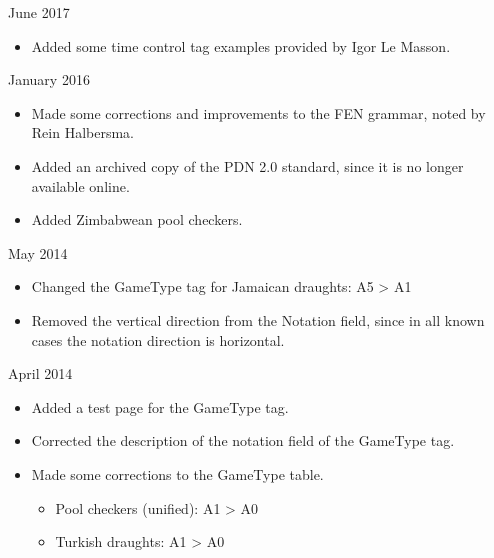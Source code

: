 \documentclass[letterpaper,10pt,english]{sphinxmanual}
\begin{document}
 June 2017
\begin{itemize}
\item {} 
\sphinxAtStartPar
Added some time control tag examples provided by Igor Le Masson.

\end{itemize}

 January 2016
\begin{itemize}
\item {} 
\sphinxAtStartPar
Made some corrections and improvements to the FEN grammar, noted by Rein Halbersma.

\item {} 
\sphinxAtStartPar
Added an archived copy of the PDN 2.0 standard, since it is no longer available online.

\item {} 
\sphinxAtStartPar
Added Zimbabwean pool checkers.

\end{itemize}

 May 2014
\begin{itemize}
\item {} 
\sphinxAtStartPar
Changed the GameType tag for Jamaican draughts: A5 \sphinxhyphen{}\textgreater{} A1

\item {} 
\sphinxAtStartPar
Removed the vertical direction from the Notation field, since in all
known cases the notation direction is horizontal.

\end{itemize}

 April 2014
\begin{itemize}
\item {} 
\sphinxAtStartPar
Added a test page for the GameType tag.

\item {} 
\sphinxAtStartPar
Corrected the description of the notation field of the GameType tag.

\item {} 
\sphinxAtStartPar
Made some corrections to the GameType table.
\begin{itemize}
\item {} 
\sphinxAtStartPar
Pool checkers (unified): A1 \sphinxhyphen{}\textgreater{} A0

\item {} 
\sphinxAtStartPar
Turkish draughts: A1 \sphinxhyphen{}\textgreater{} A0

\end{itemize}

\end{itemize}
\end{document}
